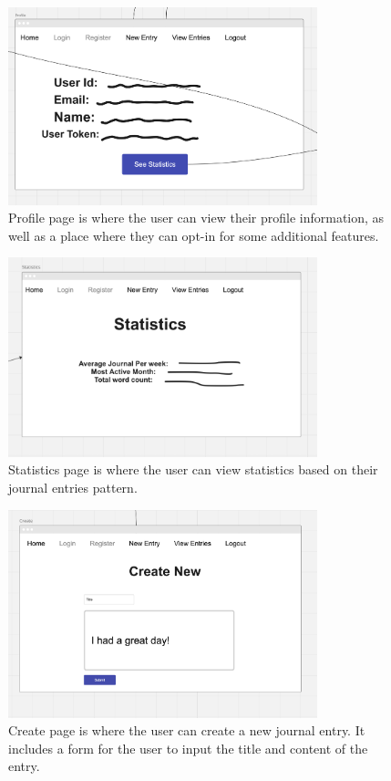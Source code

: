 \begin{figure}[H]
    \centering
    \includegraphics[width=0.8\textwidth]{Assets/profile_page.png}
    \caption{Profile page is where the user can view their profile information, as well as a place where they can opt-in for some additional features.}
\end{figure}


\begin{figure}[H]
    \centering
    \includegraphics[width=0.8\textwidth]{Assets/statistics_page.png}
    \caption{Statistics page is where the user can view statistics based on their journal entries pattern.}
\end{figure}


\begin{figure}[H]
    \centering
    \includegraphics[width=0.8\textwidth]{Assets/create_page.png}
    \caption{Create page is where the user can create a new journal entry. It includes a form for the user to input the title and content of the entry.}
\end{figure}

